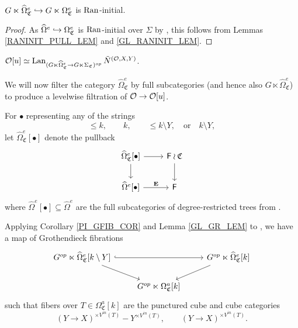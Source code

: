 \documentclass[a4paper,10pt
,draft
]{article}%
\renewcommand{\hat}{\widehat}
\renewcommand{\1}{\eta}%
\newcommand{\SC}{\Sigma_{\mathfrak C}}
\newcommand{\OC}{\Omega_{\mathfrak C}}
\begin{document}
\begin{lemma}
      $G \ltimes \hat\Omega_{\mathfrak C}^e \into G \ltimes \OC^e$ is $\operatorname{Ran}$-initial.
\end{lemma}
\begin{proof}
      As $\hat\Omega^e \into \OC^e$ is $\operatorname{Ran}$-initial over $\Sigma$ by \cite[Cor. 5.52]{BP_geo}, this follows from Lemmas \ref{RANINIT_PULL_LEM} and \ref{GL_RANINIT_LEM}.
\end{proof}

\begin{proposition}
      \label{OU_RED3_PROP}
      $\O[u] \simeq \Lan_{(G \ltimes \hat\Omega_{\mathfrak C}^{e} \to G \ltimes \SC)^{op}} \tilde N^{(\O,X,Y)}$. 
\end{proposition}

We will now filter the category $\hat\Omega_{\mathfrak C}^e$ by full subcategories (and hence also $G \ltimes \hat \Omega_{\mathfrak C}^e$)
to produce a levelwise filtration of $\mathcal{O} \to \mathcal{O}[u]$.

\begin{definition}
      For $\bullet$ representing any of the strings
      \[
            \leq k, \qquad k, \qquad \leq k \setminus Y, \quad \mbox{or} \quad k \setminus Y,
      \]
      let $\hat\Omega_{\mathfrak C}^e[\bullet]$ denote the pullback
      \[
            \begin{tikzcd}
                  \hat\Omega_{\mathfrak C}^e[\bullet] \arrow[r] \arrow[d]
                  &
                  \Fin \wr \mathfrak C \arrow[d]
                  \\
                  \hat\Omega^e[\bullet] \arrow[r, "\mathbf E"]
                  &
                  \Fin
            \end{tikzcd}
      \]
      where $\hat\Omega^e[\bullet] \subseteq \hat\Omega^e$ are the full subcategories of degree-restricted trees from \cite[Defn. 5.55]{BP_geo}.
\end{definition}

\begin{remark}
      \label{OEFIB_REM}
      Applying Corollary \ref{PI_GFIB_COR} and Lemma \ref{GL_GR_LEM} to \cite[Remark 5.57]{BP_geo}, we have a map of Grothendieck fibrations
      \begin{equation}
            \begin{tikzcd}
                  G^{op} \ltimes \hat\Omega_{\mathfrak C}^e[k \setminus Y] \arrow[rr, hookrightarrow] \arrow[dr]
                  &&
                  G^{op} \ltimes \hat\Omega_{\mathfrak C}^e[k] \arrow[dl]
                  \\
                  &
                  G^{op} \ltimes \Omega_{\mathfrak C}^a[k]
            \end{tikzcd}
      \end{equation}
      such that fibers over $T \in \Omega_{\mathfrak C}^a[k]$ are the punctured cube and cube categories
      \begin{equation}
            (Y \to X)^{\times V^{in}(T)} - Y^{\times V^{in}(T)},
            \qquad
            (Y \to X)^{\times V^{in}(T)}.
      \end{equation}
\end{remark}
\end{document}
